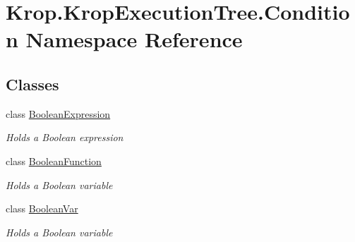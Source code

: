 \hypertarget{namespace_krop_1_1_krop_execution_tree_1_1_condition}{}\section{Krop.\+Krop\+Execution\+Tree.\+Condition Namespace Reference}
\label{namespace_krop_1_1_krop_execution_tree_1_1_condition}
\subsection*{Classes}
\begin{DoxyCompactItemize}
\item 
class \mbox{\hyperlink{class_krop_1_1_krop_execution_tree_1_1_condition_1_1_boolean_expression}{Boolean\+Expression}}
\begin{DoxyCompactList}\small\item\em Holds a Boolean expression \end{DoxyCompactList}\item 
class \mbox{\hyperlink{class_krop_1_1_krop_execution_tree_1_1_condition_1_1_boolean_function}{Boolean\+Function}}
\begin{DoxyCompactList}\small\item\em Holds a Boolean variable \end{DoxyCompactList}\item 
class \mbox{\hyperlink{class_krop_1_1_krop_execution_tree_1_1_condition_1_1_boolean_var}{Boolean\+Var}}
\begin{DoxyCompactList}\small\item\em Holds a Boolean variable \end{DoxyCompactList}\end{DoxyCompactItemize}

